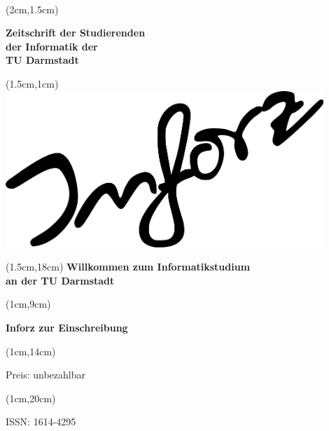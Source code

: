 \begin{titlepage}~

\begin{textblock*}{12cm}(2cm,1.5cm)
\begin{flushleft}
\large\sffamily\textbf{
\newline
Zeitschrift der Studierenden\\ 
der Informatik der \\
TU Darmstadt}  
\end{flushleft}
\end{textblock*}


\begin{textblock*}{12cm}(1.5cm,1cm)
\includegraphics[width=12cm]{../grafik/inforz}
\end{textblock*}


\begin{textblock*}{12cm}(1.5cm,18cm)
\centering\Huge\sffamily\textbf{
 \textcolor{creme}{Willkommen zum Informatikstudium \\
 an der TU Darmstadt}}
\end{textblock*}



\begin{textblock*}{5cm}(1cm,9cm)
\begin{rotate}{90}
\sffamily\huge\textbf{
	Inforz zur Einschreibung \the\year}
\end{rotate}
\end{textblock*}


\begin{textblock*}{2cm}(1cm,14cm)
\begin{rotate}{90}
\sffamily\small Preis: unbezahlbar
\end{rotate}
\end{textblock*}


\begin{textblock*}{2cm}(1cm,20cm)
\begin{rotate}{90}
\sffamily ISSN: 1614-4295
\end{rotate}
\end{textblock*}

\end{titlepage}
\newpage